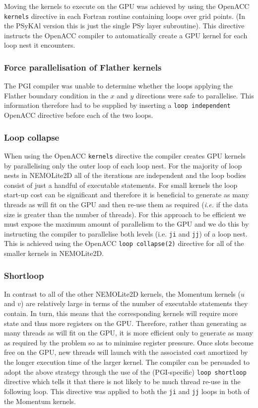 \documentclass[gmd, manuscript]{copernicus}
\begin{document}
Moving the kernels to execute on the GPU was achieved by using the
OpenACC \texttt{kernels} directive in each Fortran routine containing
loops over grid points. (In the {PS}y{KA}l version this is just the
single {PS}y layer subroutine). This directive instructs the OpenACC
compiler to automatically create a GPU kernel for each loop nest it
encounters.

\subsubsection{Force parallelisation of Flather kernels}

The PGI compiler was unable to determine whether the loops applying
the Flather boundary condition in the $x$ and $y$ directions were safe
to parallelise. This information therefore had to be supplied by
inserting a \texttt{loop independent} OpenACC directive before each of
the two loops.

\subsubsection{Loop collapse}

When using the OpenACC \texttt{kernels} directive the compiler creates
GPU kernels by parallelising only the outer loop of each loop nest.
For the majority of loop nests in NEMOLite2D all of the iterations are
independent and the loop bodies consist of just a handful of
executable statements. For small kernels the loop start-up cost can be
significant and therefore it is beneficial to generate as many threads
as will fit on the GPU and then re-use them as required (\textit{i.e.} if the
data size is greater than the number of threads). For this approach to
be efficient we must expose the maximum amount of parallelism to the
GPU and we do this by instructing the compiler to parallelise both
levels (i.e. \texttt{ji} and \texttt{jj}) of a loop nest. This is
achieved using the OpenACC \texttt{loop collapse(2)} directive for all
of the smaller kernels in NEMOLite2D.

\subsubsection{Shortloop}

In contrast to all of the other NEMOLite2D kernels, the Momentum
kernels ($u$ and $v$) are relatively large in terms of the number of
executable statements they contain. In turn, this means that the
corresponding kernels will require more state and thus more registers
on the GPU. Therefore, rather than generating as many threads as will
fit on the GPU, it is more efficient only to generate as many as
required by the problem so as to minimise register pressure. Once
slots become free on the GPU, new threads will launch with the
associated cost amortized by the longer execution time of the larger
kernel. The compiler can be persuaded
to adopt the above strategy through the use of the (PGI-specific)
\texttt{loop shortloop} directive which tells it that there is not
likely to be much thread re-use in the following loop. This directive
was applied to both the \texttt{ji} and \texttt{jj} loops in both of
the Momentum kernels.
\end{document}
